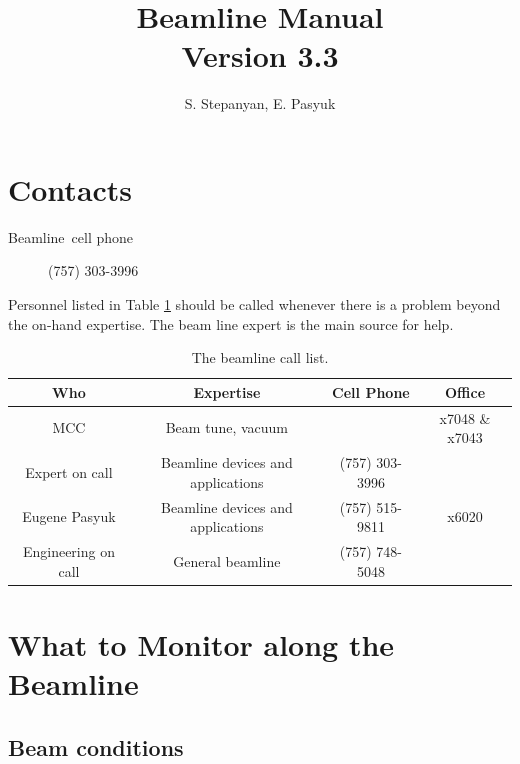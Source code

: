 \documentclass[12pt]{article}
\newcommand{\versionnumber}{3.3}
\begin{document}
\title{Beamline Manual\\\normalsize Version \versionnumber}
\author{S. Stepanyan, E. Pasyuk}
\maketitle



\section{Contacts\label{beamline_contacts}}

\begin{description}
\item [Beamline~cell phone] (757) 303-3996
\end{description}

Personnel listed in Table \ref{tab:calllist} should be called whenever there
is a problem beyond the on-hand expertise. The beam line expert is the main source for help.  
\begin{table}[tbhp]
\vspace{0.3cm}
{\centering \begin{tabular}{|c|c|c|c|}
\hline 
Who&Expertise&Cell Phone&Office\\
\hline 
\hline 
MCC&Beam tune, vacuum&&x7048 \& x7043\\
\hline 
Expert on call&Beamline devices and applications&(757) 303-3996&\\
\hline 
Eugene Pasyuk&Beamline devices and applications&(757) 515-9811&x6020\\
\hline 
Engineering on call&General beamline&(757) 748-5048&\\
\hline 
\end{tabular}\par}
\vspace{0.3cm}


\caption{The beamline call list.\label{tab:calllist}}
\end{table} 



\section{What to Monitor along the Beamline}


\subsection{Beam conditions}
\indent
\end{document}
